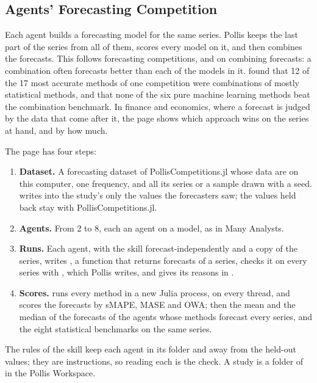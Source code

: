 \subsection{Agents' Forecasting Competition}
Each agent builds a forecasting model for the same series. Pollis keeps the last part of the series from all of
them, scores every model on it, and then combines the forecasts. This follows forecasting competitions, and
 on combining forecasts: a combination often forecasts better than each of
the models in it.  found that 12 of the 17 most
accurate methods of one competition were combinations of mostly statistical methods, and that none of the six pure
machine learning methods beat the combination benchmark. In finance and economics, where a forecast is judged by the data that come after it, the page shows
which approach wins on the series at hand, and by how much.

The page has four steps:
\begin{enumerate}
  \item \textbf{Dataset.} A forecasting dataset of PollisCompetitions.jl whose data are on this computer, one
    frequency, and all its series or a sample drawn with a seed.  writes into the study's
     only the values the forecasters saw; the values held back stay with PollisCompetitions.jl.
  \item \textbf{Agents.} From 2 to 8, each an agent on a model, as in Many Analysts.
  \item \textbf{Runs.} Each agent, with the skill forecast-independently and a copy of the series, writes
    , a function  that returns  forecasts of a series, checks
    it on every series with , which Pollis writes, and gives its reasons in .
  \item \textbf{Scores.}  runs every method in a new Julia process, on every thread, and scores the
    forecasts by sMAPE, MASE and OWA; then the mean and the median of the forecasts of the agents whose methods
    forecast every series, and the eight statistical benchmarks on the same series.
\end{enumerate}
The rules of the skill keep each agent in its folder and away from the held-out values; they are instructions, so
reading each  is the check. A study is a folder of  in
the Pollis Workspace.

